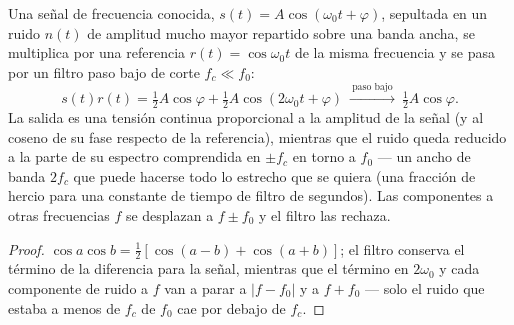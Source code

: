 \begin{proposition}\label{prop:b2:feedback-oscillators:lockin}
Una señal de frecuencia conocida, $s(t) = A\cos(\omega_0t + \varphi)$, sepultada
en un ruido $n(t)$ de amplitud mucho mayor repartido sobre una banda
ancha, se multiplica por una referencia $r(t) = \cos\omega_0t$ de la misma
frecuencia y se pasa por un filtro paso bajo de corte $f_c \ll f_0$:
\[
s(t)r(t) = \tfrac12A\cos\varphi + \tfrac12A\cos(2\omega_0t + \varphi)
\ \xrightarrow{\ \text{paso bajo}\ }\ \tfrac12A\cos\varphi .
\]
La salida es una tensión continua proporcional a la amplitud de la señal
(y al coseno de su fase respecto de la referencia), mientras que el ruido
queda reducido a la parte de su espectro comprendida en $\pm f_c$ en torno
a $f_0$ --- un ancho de banda $2f_c$ que puede hacerse todo lo estrecho que
se quiera (una fracción de hercio para una constante de tiempo de filtro
de segundos). Las componentes a otras frecuencias $f$ se desplazan a
$f \pm f_0$ y el filtro las rechaza.
\end{proposition}

\begin{proof}
$\cos a\cos b = \tfrac12[\cos(a - b) + \cos(a + b)]$; el filtro conserva el
término de la diferencia para la señal, mientras que el término en
$2\omega_0$ y cada componente de ruido a $f$ van a parar a $|f - f_0|$ y a
$f + f_0$ --- solo el ruido que estaba a menos de $f_c$ de $f_0$ cae por
debajo de $f_c$.
\end{proof}

